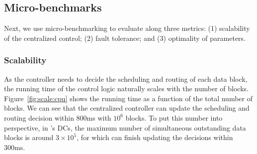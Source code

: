 

\subsection{Micro-benchmarks}
\label{subsec:evaluation:benchmarks}

Next, we use micro-benchmarking to evaluate \name along three metrics:
(1) scalability of the centralized control;
(2) fault tolerance; and
(3) optimality of \name parameters.

\subsubsection{Scalability}
\label{subsec:evaluation:benchmarks:scalability}

As the controller needs to decide the scheduling and routing of each
data block, the running time of the control logic naturally scales
with the number of blocks. Figure~\ref{fig:scale:cpu} shows the
running time as a function of the total number of blocks. We can see
that the centralized \name controller can update the scheduling and
routing decision within 800ms with $10^6$ blocks. To put this number
into perspective, in \company's DCs, the maximum number of simultaneous
outstanding data blocks is around $3\times 10^5$, for which \name can
finish updating the decisions within 300ms.

